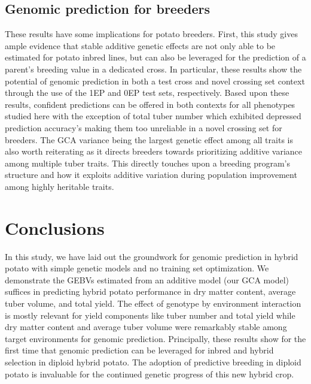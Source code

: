 \subsection{Genomic prediction for breeders}

These results have some implications for potato breeders. First, this study gives ample evidence that stable additive genetic effects are not only able to be estimated for potato inbred lines, but can also be leveraged for the prediction of a parent's breeding value in a dedicated cross. In particular, these results show the potential of genomic prediction in both a test cross and novel crossing set context through the use of the 1EP and 0EP test sets, respectively. Based upon these results, confident predictions can be offered in both contexts for all phenotypes studied here with the exception of total tuber number which exhibited depressed prediction accuracy's making them too unreliable in a novel crossing set for breeders. The GCA variance being the largest genetic effect among all traits is also worth reiterating as it directs breeders towards prioritizing additive variance among multiple tuber traits. This directly touches upon a breeding program's structure and how it exploits additive variation during population improvement among highly heritable traits. 

\section{Conclusions} %

In this study, we have laid out the groundwork for genomic prediction in hybrid potato with simple genetic models and no training set optimization. We demonstrate the GEBVs estimated from an additive model (our GCA model) suffices in predicting hybrid potato performance in dry matter content, average tuber volume, and total yield. The effect of genotype by environment interaction is mostly relevant for yield components like tuber number and total yield while dry matter content and average tuber volume were remarkably stable among target environments for genomic prediction. Principally, these results show for the first time that genomic prediction can be leveraged for inbred and hybrid selection in diploid hybrid potato. The adoption of predictive breeding in diploid potato is invaluable for the continued genetic progress of this new hybrid crop.


